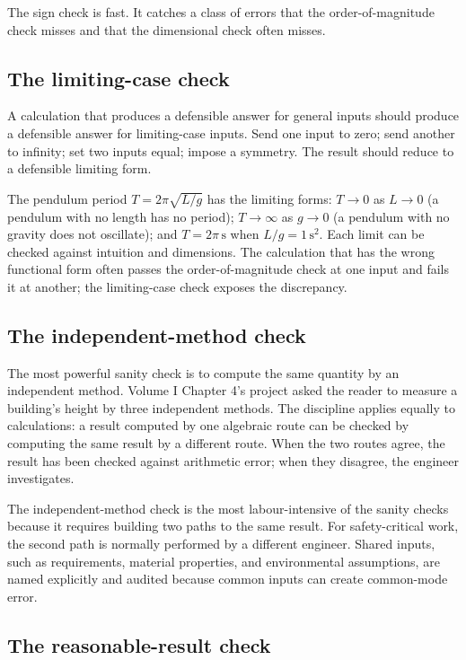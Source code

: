 The sign check is fast. It catches a class of errors that the
order-of-magnitude check misses and that the dimensional check often
misses.

\subsection{The limiting-case check}

A calculation that produces a defensible answer for general inputs
should produce a defensible answer for limiting-case inputs. Send one
input to zero; send another to infinity; set two inputs equal; impose
a symmetry. The result should reduce to a defensible limiting form.

The pendulum period $T = 2\pi \sqrt{L/g}$ has the limiting forms:
$T \to 0$ as $L \to 0$ (a pendulum with no length has no period);
$T \to \infty$ as $g \to 0$ (a pendulum with no gravity does not
oscillate); and $T = 2\pi \,\si{\second}$ when $L/g = 1 \,\si{\second
\squared}$. Each limit can be checked against intuition and dimensions.
The
calculation that has the wrong functional form often passes the
order-of-magnitude check at one input and fails it at another; the
limiting-case check exposes the discrepancy.

\subsection{The independent-method check}

The most powerful sanity check is to compute the same quantity by an
independent method. Volume I Chapter 4's project asked the reader to
measure a building's height by three independent methods. The
discipline applies equally to calculations: a result computed by one
algebraic route can be checked by computing the same result by a
different route. When the two routes agree, the result has been
checked against arithmetic error; when they disagree, the engineer
investigates.

The independent-method check is the most labour-intensive of the
sanity checks because it requires building two paths to the same
result. For safety-critical work, the second path is normally
performed by a different engineer. Shared inputs, such as
requirements, material properties, and environmental assumptions,
are named explicitly and audited because common inputs can create
common-mode error.

\subsection{The reasonable-result check}


